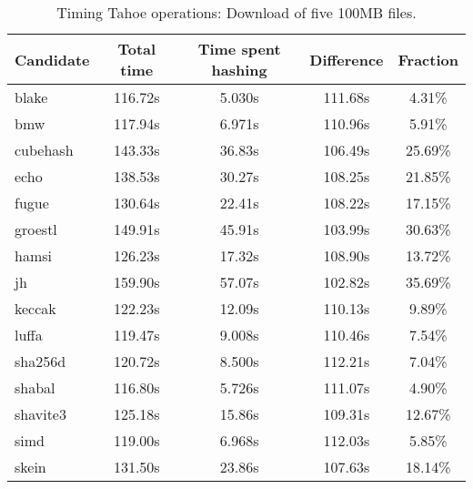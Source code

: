 \begin{table}[h]
  \centering
  \begin{tabular}{ | l | c | c | c | c | }
    \hline
    Candidate & Total time & Time spent hashing & Difference & Fraction \\ \hline
    blake & 116.72s & 5.030s & 111.68s & 4.31\% \\ \hline
    bmw & 117.94s & 6.971s & 110.96s & 5.91\% \\ \hline
    cubehash & 143.33s & 36.83s & 106.49s & 25.69\% \\ \hline
    echo & 138.53s & 30.27s & 108.25s & 21.85\% \\ \hline
    fugue & 130.64s & 22.41s & 108.22s & 17.15\% \\ \hline
    groestl & 149.91s & 45.91s & 103.99s & 30.63\% \\ \hline
    hamsi & 126.23s & 17.32s & 108.90s & 13.72\% \\ \hline
    jh & 159.90s & 57.07s & 102.82s & 35.69\% \\ \hline
    keccak & 122.23s & 12.09s & 110.13s & 9.89\% \\ \hline
    luffa & 119.47s & 9.008s & 110.46s & 7.54\% \\ \hline
    sha256d & 120.72s & 8.500s & 112.21s & 7.04\% \\ \hline
    shabal & 116.80s & 5.726s & 111.07s & 4.90\% \\ \hline
    shavite3 & 125.18s & 15.86s & 109.31s & 12.67\% \\ \hline
    simd & 119.00s & 6.968s & 112.03s & 5.85\% \\ \hline
    skein & 131.50s & 23.86s & 107.63s & 18.14\% \\ \hline
  \end{tabular}
  \caption{Timing Tahoe operations: Download of five 100MB files.}
  \label{tbl:hashingtimes:get100mb}
\end{table}
